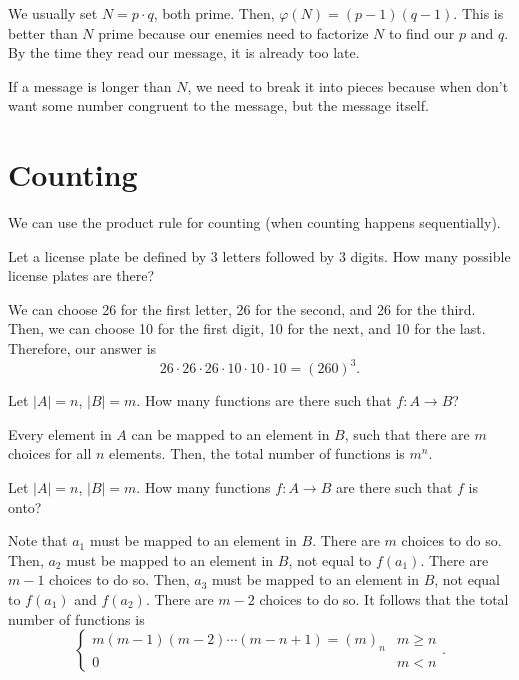 \documentclass[a4paper]{article}
\begin{document}
\begin{remark}
	We usually set \( N=p\cdot q \), both prime. Then, \( \varphi(N) = (p-1)(q-1) \). This is better than \( N \) prime because our enemies need to factorize \( N \) to find our \( p \) and \( q \). By the time they read our message, it is already too late.
\end{remark}

\begin{note}
	If a message is longer than \( N \), we need to break it into pieces because when don't want some number congruent to the message, but the message itself.
\end{note}


\section{Counting}

We can use the product rule for counting (when counting happens sequentially).

\begin{eg}
	Let a license plate be defined by 3 letters followed by 3 digits. How many possible license plates are there?
\end{eg}

We can choose 26 for the first letter, 26 for the second, and 26 for the third. Then, we can choose 10 for the first digit, 10 for the next, and 10 for the last. Therefore, our answer is \[
	26\cdot 26\cdot 26\cdot 10\cdot 10\cdot 10=(260)^3
.\] 

\begin{eg}
	Let \( |A|=n \), \( |B|=m \). How many functions are there such that \( f:A\to B \)?
\end{eg}

Every element in \( A \) can be mapped to an element in \( B \), such that there are \( m \) choices for all \( n \) elements. Then, the total number of functions is \( m^n\).

\begin{eg}
	Let \( |A|=n \), \( |B|=m \). How many functions \( f:A\to B \) are there such that \( f \) is onto?
\end{eg}

Note that \( a_{1} \) must be mapped to an element in \( B \). There are \( m \) choices to do so. Then, \( a_{2} \) must be mapped to an element in \( B \), not equal to \( f(a_{1}) \). There are \( m-1 \) choices to do so. Then, \( a_{3} \) must be mapped to an element in \( B \), not equal to \( f(a_{1}) \) and \( f(a_{2}) \). There are \( m-2 \) choices to do so. It follows that the total number of functions is \[
	\begin{cases}
		m(m-1)(m-2)\cdots(m-n+1)=(m)_n & m \ge n\\
		0 & m < n
	\end{cases}
.\] 
\end{document}
